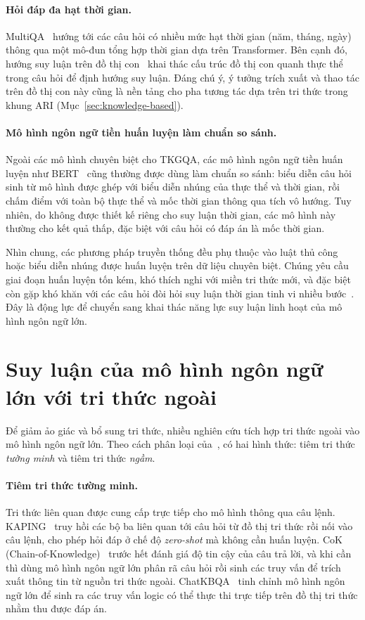 \paragraph{Hỏi đáp đa hạt thời gian.} MultiQA~\cite{chen2023multitq} hướng tới các câu hỏi có nhiều
mức hạt thời gian (năm, tháng, ngày) thông qua một mô-đun tổng hợp thời gian dựa trên Transformer.
Bên cạnh đó, hướng suy luận trên đồ thị con~\cite{chen2022subgraph} khai thác cấu trúc đồ thị con
quanh thực thể trong câu hỏi để định hướng suy luận. Đáng chú ý, ý tưởng trích xuất và thao tác
trên đồ thị con này cũng là nền tảng cho pha tương tác dựa trên tri thức trong khung ARI
(Mục~\ref{sec:knowledge-based}).

\paragraph{Mô hình ngôn ngữ tiền huấn luyện làm chuẩn so sánh.} Ngoài các mô hình chuyên biệt cho
TKGQA, các mô hình ngôn ngữ tiền huấn luyện như BERT~\cite{devlin2019bert} cũng thường được dùng
làm chuẩn so sánh: biểu diễn câu hỏi sinh từ mô hình được ghép với biểu diễn nhúng của thực thể và
thời gian, rồi chấm điểm với toàn bộ thực thể và mốc thời gian thông qua tích vô hướng. Tuy nhiên,
do không được thiết kế riêng cho suy luận thời gian, các mô hình này thường cho kết quả thấp, đặc
biệt với câu hỏi có đáp án là mốc thời gian.

Nhìn chung, các phương pháp truyền thống đều phụ thuộc vào luật thủ công hoặc biểu diễn nhúng được
huấn luyện trên dữ liệu chuyên biệt. Chúng yêu cầu giai đoạn huấn luyện tốn kém, khó thích nghi với
miền tri thức mới, và đặc biệt còn gặp khó khăn với các câu hỏi đòi hỏi suy luận thời gian tinh vi
nhiều bước~\cite{chen2022subgraph}. Đây là động lực để chuyển sang khai thác năng lực suy luận linh
hoạt của mô hình ngôn ngữ lớn.

\section{Suy luận của mô hình ngôn ngữ lớn với tri thức ngoài}
\label{sec:llm-external}

Để giảm ảo giác và bổ sung tri thức, nhiều nghiên cứu tích hợp tri thức ngoài vào mô hình ngôn ngữ
lớn. Theo cách phân loại của~\cite{baek2023kaping}, có hai hình thức: tiêm tri thức \textit{tường
minh} và tiêm tri thức \textit{ngầm}.

\paragraph{Tiêm tri thức tường minh.} Tri thức liên quan được cung cấp trực tiếp cho mô hình thông
qua câu lệnh. KAPING~\cite{baek2023kaping} truy hồi các bộ ba liên quan tới câu hỏi từ đồ thị tri
thức rồi nối vào câu lệnh, cho phép hỏi đáp ở chế độ \textit{zero-shot} mà không cần huấn luyện.
CoK (Chain-of-Knowledge)~\cite{li2023cok} trước hết đánh giá độ tin cậy của câu trả lời, và khi cần
thì dùng mô hình ngôn ngữ lớn phân rã câu hỏi rồi sinh các truy vấn để trích xuất thông tin từ
nguồn tri thức ngoài. ChatKBQA~\cite{luo2023chatkbqa} tinh chỉnh mô hình ngôn ngữ lớn để sinh ra
các truy vấn logic có thể thực thi trực tiếp trên đồ thị tri thức nhằm thu được đáp án.

